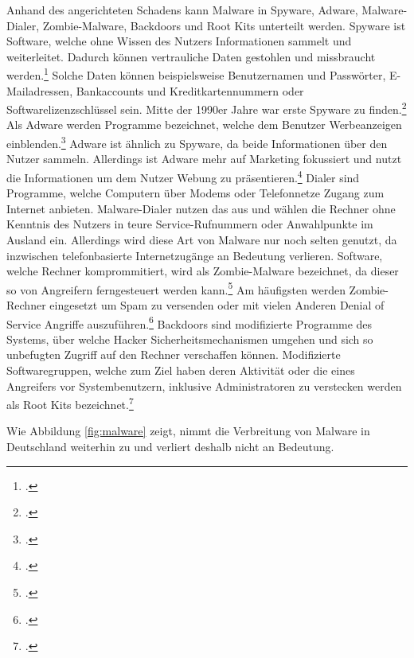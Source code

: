 Anhand des angerichteten Schadens kann Malware in Spyware, Adware, Malware-Dialer, Zombie-Malware,
Backdoors und Root Kits unterteilt werden. Spyware ist Software, welche ohne Wissen des Nutzers
Informationen sammelt und weiterleitet. Dadurch können vertrauliche Daten gestohlen und missbraucht
werden.\footcite[Vgl.][95\psq]{netzwerkDatensicherheit} Solche Daten können beispielsweise
Benutzernamen und Passwörter, E-Mailadressen, Bankaccounts und Kreditkartennummern oder
Softwarelizenzschlüssel sein. Mitte der 1990er Jahre war erste Spyware zu
finden.\footcite[Vgl.][16]{virusesMalware} Als Adware werden Programme bezeichnet, welche dem
Benutzer Werbeanzeigen einblenden.\footcite[Vgl.][96]{netzwerkDatensicherheit} Adware ist ähnlich
zu Spyware, da beide Informationen über den Nutzer sammeln. Allerdings ist Adware mehr auf
Marketing fokussiert und nutzt die Informationen um dem Nutzer Webung zu
präsentieren.\footcite[Vgl.][17]{virusesMalware} Dialer sind Programme, welche Computern über
Modems oder Telefonnetze Zugang zum Internet anbieten. Malware-Dialer nutzen das aus und wählen die
Rechner ohne Kenntnis des Nutzers in teure Service-Rufnummern oder Anwahlpunkte im Ausland ein.
Allerdings wird diese Art von Malware nur noch selten genutzt, da inzwischen
telefonbasierte Internetzugänge an Bedeutung verlieren. Software, welche Rechner komprommitiert, wird als
Zombie-Malware bezeichnet, da dieser so von Angreifern ferngesteuert werden
kann.\footcite[Vgl.][96]{netzwerkDatensicherheit} Am häufigsten werden Zombie-Rechner eingesetzt um
Spam zu versenden oder mit vielen Anderen Denial of Service Angriffe
auszuführen.\footcite[Vgl.][18]{virusesMalware} Backdoors sind modifizierte Programme des Systems,
über welche Hacker Sicherheitsmechanismen umgehen und sich so unbefugten Zugriff auf den Rechner
verschaffen können. Modifizierte Softwaregruppen, welche zum Ziel haben deren Aktivität oder die
eines Angreifers vor Systembenutzern, inklusive Administratoren zu verstecken werden als Root Kits
bezeichnet.\footcite[Vgl.][96]{netzwerkDatensicherheit}

Wie Abbildung \ref{fig:malware} zeigt, nimmt die Verbreitung von Malware in Deutschland weiterhin zu
und verliert deshalb nicht an Bedeutung.

